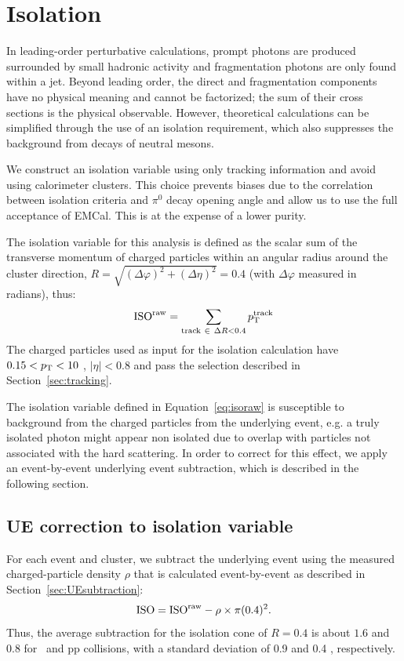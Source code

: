 
\section{Isolation}
\label{sec:isolation}
In leading-order perturbative calculations, prompt photons are produced surrounded by small hadronic activity and fragmentation photons are only found within a jet. Beyond leading order, the direct and fragmentation components have no physical meaning and cannot be factorized; the sum of their cross sections is the physical observable. However, theoretical calculations can be simplified through the use of an isolation requirement, which also suppresses the background from decays of neutral mesons.

We construct an isolation variable using only tracking information and avoid using calorimeter clusters. This choice prevents biases due to the correlation between 
isolation criteria and $\pi^{0}$ decay opening angle and allow us to use the full acceptance of EMCal. This is at the expense of a lower purity.

The isolation variable for this analysis is defined as the scalar sum of the transverse momentum of charged particles within an angular radius around the cluster direction, $R =\sqrt{(\Delta\varphi)^{2} +(\Delta\eta)^{2}  } =0.4$ (with $\Delta\varphi$ measured in radians), thus:
\begin{equation}
\mathrm{ISO}^{\mathrm{raw}} = \sum_{\mathrm{track}~\in~\Delta R < 0.4}  p_{\mathrm{T}}^{\mathrm{track}}   
\label{eq:isoraw}
\end{equation}
The charged particles used as input for the isolation calculation have {$0.15<p_{\mathrm{T}}<10$ \GeVc}, {$|\eta|<0.8$} and pass the selection described in Section~\ref{sec:tracking}. 

The isolation variable defined in Equation~\ref{eq:isoraw} is susceptible to background from the charged particles from the underlying event, e.g. a truly isolated photon might appear non isolated due to overlap with particles not associated with the hard scattering. In order to correct for this effect, we apply an event-by-event underlying event subtraction, which is described in the following section. 



\subsection{UE correction to isolation variable}
For each event and cluster, we subtract the underlying event using the measured charged-particle density $\rho$ that is calculated event-by-event as described in Section~\ref{sec:UEsubtraction}:
\begin{equation}
\mathrm{ISO} = \mathrm{ISO}^{\mathrm{raw}} - \rho\times\pi(0.4)^{2}.
\end{equation}
Thus, the average subtraction for the isolation cone of {$R=0.4$} is about {$1.6$ \GeVc} and {$0.8$ \GeVc} for \pPb~and pp collisions, with a standard deviation of {0.9 \GeVc} and {0.4 \GeVc}, respectively.  

